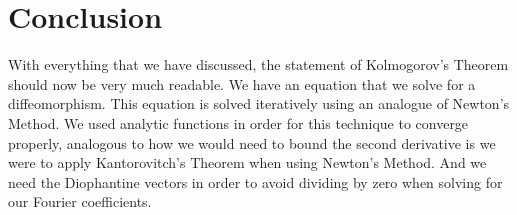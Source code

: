 \documentclass[twoside,letterpaper,10pt]{article}
\numberwithin{equation}{section}
\begin{document}
\section{Conclusion}
\label{sec:conclusion}

With everything that we have discussed, the statement of Kolmogorov's Theorem
should now be very much readable.
We have an equation that we solve for a diffeomorphism.
This equation is solved iteratively using an analogue of Newton's Method.
We used analytic functions in order for this technique to converge properly,
analogous to how we would need to bound the second derivative is we were to
apply Kantorovitch's Theorem when using Newton's Method.
And we need the Diophantine vectors in order to avoid dividing by zero when
solving for our Fourier coefficients.



\end{document}

